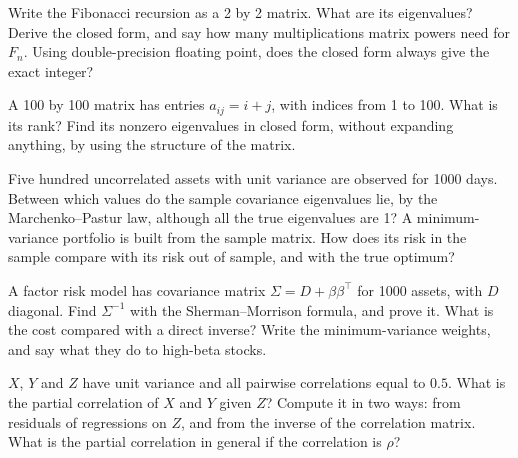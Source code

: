 \begin{question}\label{iq:iv1:linear-algebra:16}
Write the Fibonacci recursion as a 2 by 2 matrix. What are its eigenvalues? Derive the closed form, and say how many multiplications matrix powers need for $F_n$. Using double-precision floating point, does the closed form always give the exact integer?
\end{question}

\begin{question}\label{iq:iv1:linear-algebra:17}
A 100 by 100 matrix has entries $a_{ij} = i + j$, with indices from 1 to 100. What is its rank? Find its nonzero eigenvalues in closed form, without expanding anything, by using the structure of the matrix.
\end{question}

\begin{question}\label{iq:iv1:linear-algebra:18}
Five hundred uncorrelated assets with unit variance are observed for 1000 days. Between which values do the sample covariance eigenvalues lie, by the Marchenko--Pastur law, although all the true eigenvalues are 1? A minimum-variance portfolio is built from the sample matrix. How does its risk in the sample compare with its risk out of sample, and with the true optimum?
\end{question}

\begin{question}\label{iq:iv1:linear-algebra:19}
A factor risk model has covariance matrix $\Sigma = D + \beta\beta^\top$ for 1000 assets, with $D$ diagonal. Find $\Sigma^{-1}$ with the Sherman--Morrison formula, and prove it. What is the cost compared with a direct inverse? Write the minimum-variance weights, and say what they do to high-beta stocks.
\end{question}

\begin{question}\label{iq:iv1:linear-algebra:20}
$X$, $Y$ and $Z$ have unit variance and all pairwise correlations equal to $0.5$. What is the partial correlation of $X$ and $Y$ given $Z$? Compute it in two ways: from residuals of regressions on $Z$, and from the inverse of the correlation matrix. What is the partial correlation in general if the correlation is $\rho$?
\end{question}

